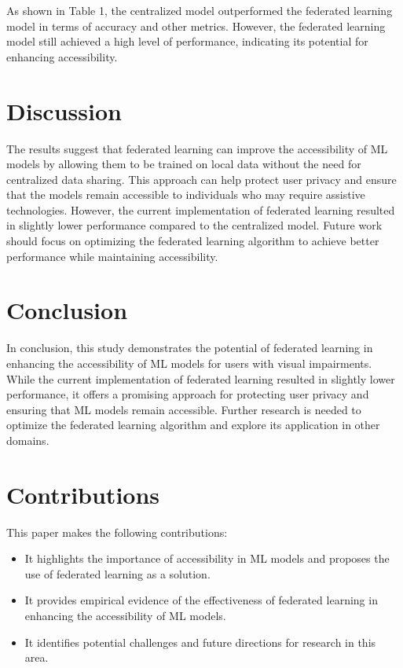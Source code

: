 As shown in Table 1, the centralized model outperformed the federated learning model in terms of accuracy and other metrics. However, the federated learning model still achieved a high level of performance, indicating its potential for enhancing accessibility.

\section{Discussion}
The results suggest that federated learning can improve the accessibility of ML models by allowing them to be trained on local data without the need for centralized data sharing. This approach can help protect user privacy and ensure that the models remain accessible to individuals who may require assistive technologies. However, the current implementation of federated learning resulted in slightly lower performance compared to the centralized model. Future work should focus on optimizing the federated learning algorithm to achieve better performance while maintaining accessibility.

\section{Conclusion}
In conclusion, this study demonstrates the potential of federated learning in enhancing the accessibility of ML models for users with visual impairments. While the current implementation of federated learning resulted in slightly lower performance, it offers a promising approach for protecting user privacy and ensuring that ML models remain accessible. Further research is needed to optimize the federated learning algorithm and explore its application in other domains.

\section{Contributions}
This paper makes the following contributions:
\begin{itemize}
    \item It highlights the importance of accessibility in ML models and proposes the use of federated learning as a solution.
    \item It provides empirical evidence of the effectiveness of federated learning in enhancing the accessibility of ML models.
    \item It identifies potential challenges and future directions for research in this area.
\end{itemize}

